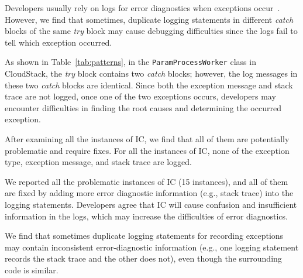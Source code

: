 
Developers usually rely on logs for error diagnostics when exceptions occur~\cite{Yuan:2014:STP:2685048.2685068}. However, we find that sometimes, duplicate logging statements in different {\em catch} blocks of the same {\em try} block may cause debugging difficulties since the logs fail to tell which exception occurred.

As shown in Table~\ref{tab:patterns}, in the {\tt\small ParamProcessWorker} class in CloudStack, the {\em try} block contains two {\em catch} blocks; however, the log messages in these two {\em catch} blocks are identical. Since both the exception message and stack trace are not logged, once one of the two exceptions occurs, developers may encounter difficulties in finding the root causes and determining the occurred exception.

After examining all the instances of IC, we find that all of them are potentially problematic and require fixes. For all the instances of IC, none of the exception type, exception message, and stack trace are logged. %

We reported all the problematic instances of IC (15 instances), and all of them are fixed by adding more error diagnostic information (e.g., stack trace) into the logging statements. %
Developers agree that IC will cause confusion and insufficient information in the logs, which may increase the difficulties of error diagnostics.

We find that sometimes duplicate logging statements for recording exceptions may contain inconsistent error-diagnostic information (e.g., one logging statement records the stack trace and the other does not), even though the surrounding code is similar. %

